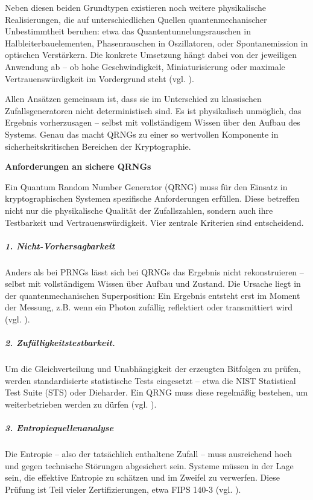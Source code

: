 Neben diesen beiden Grundtypen existieren noch weitere physikalische Realisierungen, die auf unterschiedlichen Quellen quantenmechanischer Unbestimmtheit beruhen: etwa das Quantentunnelungsrauschen in Halbleiterbauelementen, Phasenrauschen in Oszillatoren, oder Spontanemission in optischen Verstärkern. Die konkrete Umsetzung hängt dabei von der jeweiligen Anwendung ab – ob hohe Geschwindigkeit, Miniaturisierung oder maximale Vertrauenswürdigkeit im Vordergrund steht (vgl. \cite{herrero-collantes_et_al_quantum_2017}).


Allen Ansätzen gemeinsam ist, dass sie im Unterschied zu klassischen Zufallsgeneratoren nicht deterministisch sind. Es ist physikalisch unmöglich, das Ergebnis vorherzusagen – selbst mit vollständigem Wissen über den Aufbau des Systems. Genau das macht QRNGs zu einer so wertvollen Komponente in sicherheitskritischen Bereichen der Kryptographie.


\vspace{1em}
\textbf{Anforderungen an sichere QRNGs}


Ein Quantum Random Number Generator (QRNG) muss für den Einsatz in kryptographischen Systemen spezifische Anforderungen erfüllen. Diese betreffen nicht nur die physikalische Qualität der Zufallszahlen, sondern auch ihre Testbarkeit und Vertrauenswürdigkeit. Vier zentrale Kriterien sind entscheidend.
\subparagraph{1. Nicht-Vorhersagbarkeit}
Anders als bei PRNGs lässt sich bei QRNGs das Ergebnis nicht rekonstruieren – selbst mit vollständigem Wissen über Aufbau und Zustand. Die Ursache liegt in der quantenmechanischen Superposition: Ein Ergebnis entsteht erst im Moment der Messung, z.B. wenn ein Photon zufällig reflektiert oder transmittiert wird (vgl. \cite{herrero-collantes_et_al_quantum_2017, ma_x_et_al_quantum_2016}).

\subparagraph{2. Zufälligkeitstestbarkeit.}
Um die Gleichverteilung und Unabhängigkeit der erzeugten Bitfolgen zu prüfen, werden standardisierte statistische Tests eingesetzt – etwa die NIST Statistical Test Suite (STS) oder Dieharder. Ein QRNG muss diese regelmäßig bestehen, um weiterbetrieben werden zu dürfen (vgl. \cite{nist_fips_2024}).
 
\subparagraph{3. Entropiequellenanalyse}
Die Entropie – also der tatsächlich enthaltene Zufall – muss ausreichend hoch und gegen technische Störungen abgesichert sein. Systeme müssen in der Lage sein, die effektive Entropie zu schätzen und im Zweifel zu verwerfen. Diese Prüfung ist Teil vieler Zertifizierungen, etwa FIPS 140-3 (vgl. \cite{ma_x_et_al_quantum_2016, nist_fips_2024}).

